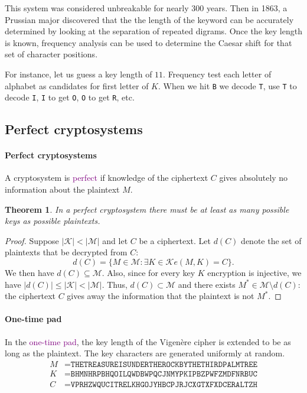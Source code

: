 \documentclass[a4paper, 11pt, openany]{book}
\numberwithin{equation}{section}
\theoremstyle{plain}
\newtheorem{theorem}	[equation]	{Theorem}
\theoremstyle{definition}
\newcommand{\Define}[1]{\textcolor{purple}{#1}}
\newcommand{\alphabet}[1]{\mathcal{#1}}
\begin{document}
This system was considered unbreakable for nearly 300 years. Then in 1863, a Prussian major discovered that the the length of the keyword can be accurately determined by looking at the separation of repeated digrams. Once the key length is known, frequency analysis can be used to determine the Caesar shift for that set of character positions.

For instance, let us guess a key length of $11$.
Frequency test each letter of alphabet as candidates for first letter of $K$. When we hit \texttt{B} we decode \texttt{T}, use \texttt{T} to decode \texttt{I}, \texttt{I} to get \texttt{O}, \texttt{O} to get \texttt{R}, etc.









\subsection{Perfect cryptosystems}

\paragraph{Perfect cryptosystems}
A cryptosystem is \Define{perfect} if knowledge of the ciphertext $C$ gives absolutely no information about the plaintext $M$.

\begin{theorem}
In a perfect cryptosystem there must be at least as many possible keys as possible plaintexts. 
\end{theorem}

\begin{proof}
Suppose $|\alphabet{K}| < |\alphabet{M}|$ and let $C$ be a ciphertext. Let $d(C)$ denote the set of plaintexts that be decrypted from $C$:
\[
    d(C) = \{M \in \alphabet{M} : \exists K \in \alphabet{K} e(M,K) = C\}.
\]
We then have $d(C) \subseteq \alphabet{M}$. Also, since for every key $K$ encryption is injective, we have $|d(C)| \le |\alphabet{K}| < |\alphabet{M}|$. Thus, $d(C) \subset \alphabet{M}$ and there exists $M^* \in \alphabet{M} \setminus d(C)$: the ciphertext $C$ gives away the information that the plaintext is not $M^*$.
\end{proof}


\paragraph{One-time pad}
In the \Define{one-time pad}, the key length of the Vigen\`ere cipher is extended to be as long as the plaintext. The key characters are generated uniformly at random.
\begin{align*}
    M &= \texttt{THETREASUREISUNDERTHEROCKBYTHETHIRDPALMTREE}\\
    K &= \texttt{BHMNHRPBHQOILQWDBWPQCJNMYPKIPBZPWFZMDFNRBUC}\\
    C &= \texttt{VPRHZWQUCITRELKHGOJYHBCPJRJCXGTXFXDCERALTZH}
\end{align*}
\end{document}
